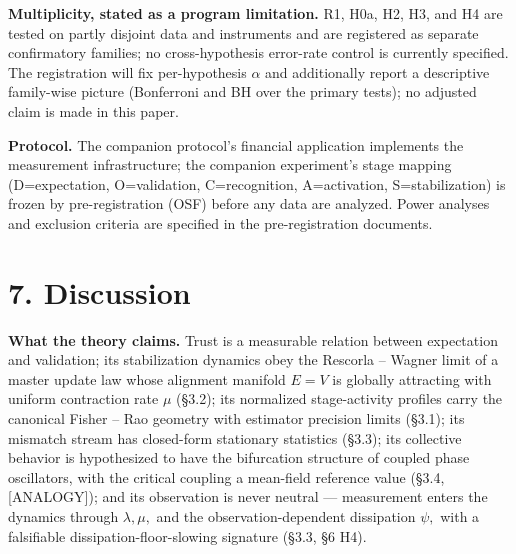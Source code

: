\documentclass[
]{article}
\begin{document}
\textbf{Multiplicity, stated as a program limitation.} R1, H0a, H2, H3,
and H4 are tested on partly disjoint data and instruments and are
registered as separate confirmatory families; no cross-hypothesis
error-rate control is currently specified. The registration will fix
per-hypothesis \(\alpha\) and additionally report a descriptive
family-wise picture (Bonferroni and BH over the primary tests); no
adjusted claim is made in this paper.

\textbf{Protocol.} The companion protocol's financial application
implements the measurement infrastructure; the companion experiment's
stage mapping (D=expectation, O=validation, C=recognition, A=activation,
S=stabilization) is frozen by pre-registration (OSF) before any data are
analyzed. Power analyses and exclusion criteria are specified in the
pre-registration documents.

\section{7. Discussion}\label{discussion}

\textbf{What the theory claims.} Trust is a measurable relation between
expectation and validation; its stabilization dynamics obey the Rescorla
-- Wagner limit of a master update law whose alignment manifold
\(E = V\) is globally attracting with uniform contraction rate \(\mu\)
(§3.2); its normalized stage-activity profiles carry the canonical
Fisher -- Rao geometry with estimator precision limits (§3.1); its
mismatch stream has closed-form stationary statistics (§3.3); its
collective behavior is hypothesized to have the bifurcation structure of
coupled phase oscillators, with the critical coupling a mean-field
reference value (§3.4, {[}ANALOGY{]}); and its observation is never
neutral --- measurement enters the dynamics through \(\lambda, \mu,\)
and the observation-dependent dissipation \(\psi,\) with a falsifiable
dissipation-floor-slowing signature (§3.3, §6 H4).
\end{document}
